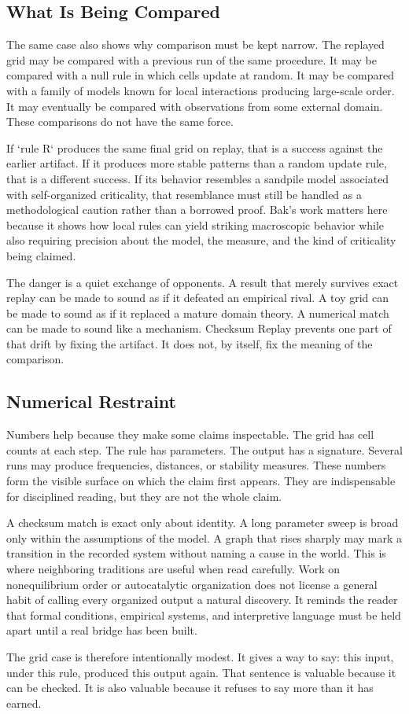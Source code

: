 \documentclass[11pt,a4paper,openany]{book}
\begin{document}
\subsection{What Is Being Compared}
The same case also shows why comparison must be kept narrow. The replayed grid may be compared with a previous run of the same procedure. It may be compared with a null rule in which cells update at random. It may be compared with a family of models known for local interactions producing large-scale order. It may eventually be compared with observations from some external domain. These comparisons do not have the same force. \cite{nicolis_prigogine_selforg,kauffman_autocatalytic}\par
If `rule R` produces the same final grid on replay, that is a success against the earlier artifact. If it produces more stable patterns than a random update rule, that is a different success. If its behavior resembles a sandpile model associated with self-organized criticality, that resemblance must still be handled as a methodological caution rather than a borrowed proof. Bak's work matters here because it shows how local rules can yield striking macroscopic behavior while also requiring precision about the model, the measure, and the kind of criticality being claimed.\par
The danger is a quiet exchange of opponents. A result that merely survives exact replay can be made to sound as if it defeated an empirical rival. A toy grid can be made to sound as if it replaced a mature domain theory. A numerical match can be made to sound like a mechanism. Checksum Replay prevents one part of that drift by fixing the artifact. It does not, by itself, fix the meaning of the comparison.\par
\subsection{Numerical Restraint}
Numbers help because they make some claims inspectable. The grid has cell counts at each step. The rule has parameters. The output has a signature. Several runs may produce frequencies, distances, or stability measures. These numbers form the visible surface on which the claim first appears. They are indispensable for disciplined reading, but they are not the whole claim. \cite{nicolis_prigogine_selforg,kauffman_autocatalytic}\par
A checksum match is exact only about identity. A long parameter sweep is broad only within the assumptions of the model. A graph that rises sharply may mark a transition in the recorded system without naming a cause in the world. This is where neighboring traditions are useful when read carefully. Work on nonequilibrium order or autocatalytic organization does not license a general habit of calling every organized output a natural discovery. It reminds the reader that formal conditions, empirical systems, and interpretive language must be held apart until a real bridge has been built.\par
The grid case is therefore intentionally modest. It gives a way to say: this input, under this rule, produced this output again. That sentence is valuable because it can be checked. It is also valuable because it refuses to say more than it has earned.\par
\end{document}

